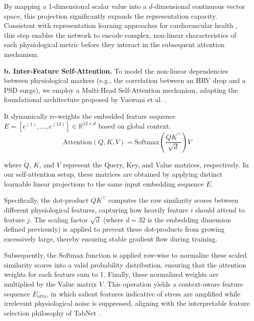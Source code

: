 \documentclass[journal,twoside,web]{ieeecolor}
\begin{document}
By mapping a 1-dimensional scalar value into a $d$-dimensional continuous vector space, this projection significantly expands the representation capacity. Consistent with representation learning approaches for cardiovascular health \cite{ballinger2018deepheart}, this step enables the network to encode complex, non-linear characteristics of each physiological metric before they interact in the subsequent attention mechanism.



\textbf{b. Inter-Feature Self-Attention.} 
To model the non-linear dependencies between physiological markers (e.g., the correlation between an HRV drop and a PSD surge), we employ a Multi-Head Self-Attention mechanism, adapting the foundational architecture proposed by Vaswani et al. \cite{vaswani2017attention}.

It dynamically re-weights the embedded feature sequence $E = [e^{(1)}, \dots, e^{(12)}] \in \mathbb{R}^{12 \times d}$ based on global context.
\begin{equation}
\text{Attention}(Q, K, V) = \text{Softmax}\left(\frac{QK^\top}{\sqrt{d}}\right) V
\end{equation}

where $Q$, $K$, and $V$ represent the Query, Key, and Value matrices, respectively. In our self-attention setup, these matrices are obtained by applying distinct learnable linear projections to the same input embedding sequence $E$.

Specifically, the dot-product $QK^\top$ computes the raw similarity scores between different physiological features, capturing how heavily feature $i$ should attend to feature $j$. The scaling factor $\sqrt{d}$ (where $d=32$ is the embedding dimension defined previously) is applied to prevent these dot-products from growing excessively large, thereby ensuring stable gradient flow during training.

Subsequently, the $\text{Softmax}$ function is applied row-wise to normalize these scaled similarity scores into a valid probability distribution, ensuring that the attention weights for each feature sum to 1. Finally, these normalized weights are multiplied by the Value matrix $V$. This operation yields a context-aware feature sequence $E_{attn}$, in which salient features indicative of stress are amplified while irrelevant physiological noise is suppressed, aligning with the interpretable feature selection philosophy of TabNet \cite{arik2021tabnet}.
\end{document}
